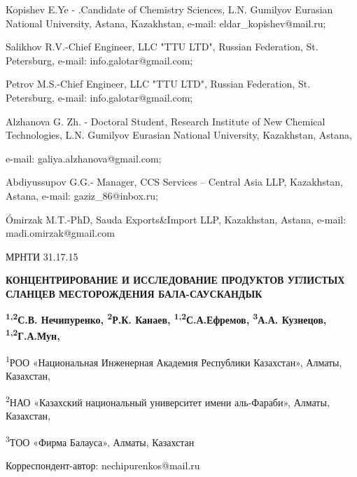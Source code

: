 Kopishev E.Ye - .Candidate of Chemistry Sciences, L.N. Gumilyov Eurasian
National University, Astana, Kazakhstan, e-mail:
eldar\_kopishev@mail.ru;

Salikhov R.V.-Chief Engineer, LLC "TTU LTD", Russian Federation, St.
Petersburg, e-mail: info.galotar@gmail.com;

Petrov M.S.-Chief Engineer, LLC "TTU LTD", Russian Federation, St.
Petersburg, e-mail: info.galotar@gmail.com;

Alzhanova G. Zh. - Doctoral Student, Research Institute of New Chemical
Technologies, L.N. Gumilyov Eurasian National University, Kazakhstan,
Astana,

e-mail: galiya.alzhanova@gmail.com;

Abdiyussupov G.G.- Manager, CCS Services -- Central Asia LLP,
Kazakhstan, Astana, e-mail: gaziz\_86@inbox.ru;

Ómirzak M.T.-PhD, Sauda Exports\&Import LLP, Kazakhstan, Astana, e-mail:
madi.omirzak@gmail.com

МРНТИ 31.17.15

\textbf{КОНЦЕНТРИРОВАНИЕ И ИССЛЕДОВАНИЕ ПРОДУКТОВ УГЛИСТЫХ СЛАНЦЕВ
МЕСТОРОЖДЕНИЯ БАЛА-САУСКАНДЫК}

\textbf{\textsuperscript{1,2}С.В. Нечипуренко, \textsuperscript{2}Р.К.
Канаев, \textsuperscript{1,2}С.А.Ефремов, \textsuperscript{3}А.А.
Кузнецов, \textsuperscript{1,2}Г.А.Мун,}

\textsuperscript{1}РОО «Национальная Инженерная Академия Республики
Казахстан», Алматы, Казахстан,

\textsuperscript{2}НАО «Казахский национальный университет имени
аль-Фараби», Алматы, Казахстан,

\textsuperscript{3}ТОО «Фирма Балауса», Алматы, Казахстан

Корреспондент-автор: nechipurenkos@mail.ru

